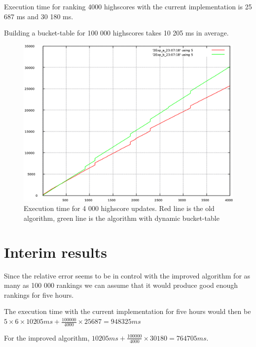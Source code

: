 Execution time for ranking 4000 highscores with the current implementation is 25 687 ms and 30 180 ms. 

Building a bucket-table for 100 000 highscores takes 10 205 ms in average. 

\begin{figure}[h!]
  \centering
  \caption{Execution time for 4 000 highscore updates. Red line is the old algorithm, green line is the algorithm with dynamic bucket-table}
  \label{fig:relerror}
  \includegraphics[width=12cm]{img/exec-time} 
\end{figure}

\section{Interim results}

Since the relative error seems to be in control with the improved algorithm for as many as 100 000 rankings we can assume that it would produce good enough rankings for five hours.

The execution time with the current implementation for five hours would then be $5 \times 6 \times 10 205 ms + \frac{100 000}{4000} \times 25 687 = 948 325 ms$

For the improved algorithm, $10 205 ms + \frac{100 000}{4000} \times 30 180 = 764705 ms$.
